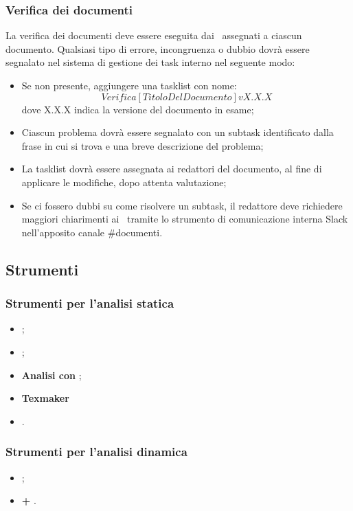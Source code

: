 \documentclass[../NormeDiProgetto.tex]{subfiles}
\begin{document}
\subsubsection{Verifica dei documenti}
	La verifica dei documenti deve essere eseguita dai \verificatori\ assegnati a ciascun documento. Qualsiasi tipo di errore, incongruenza o dubbio dovrà essere segnalato nel sistema di gestione dei task interno  nel seguente modo:
	\begin{itemize}
		\item Se non presente, aggiungere una tasklist con nome:\\
		\begin{equation*}
			Verifica [TitoloDelDocumento] vX.X.X
		\end{equation*}
		dove X.X.X indica la versione del documento in esame;
		\item Ciascun problema dovrà essere segnalato con un subtask identificato dalla frase in cui si trova e una breve descrizione del problema;
		\item La tasklist dovrà essere assegnata ai redattori del documento, al fine di applicare le modifiche, dopo attenta valutazione;
		\item Se ci fossero dubbi su come risolvere un subtask, il redattore deve richiedere maggiori chiarimenti ai \verificatori\ tramite lo strumento di comunicazione interna Slack nell'apposito canale \#documenti.
	\end{itemize}

\subsection{Strumenti}
	\subsubsection{Strumenti per l'analisi statica}
		\begin{itemize}
  			\item \textbf{};
 			\item \textbf{};
  			\item \textbf{Analisi con };
 			\item \textbf{Texmaker}
        \item \textbf{}.

		\end{itemize}
	\subsubsection{Strumenti per l'analisi dinamica}
		\begin{itemize}
 			\item \textbf{};
 			\item \textbf{ + }.
	\end{itemize}
\end{document}
